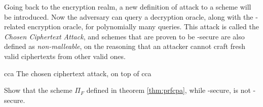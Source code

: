 Going back to the encryption realm, a new definition of attack to a \ske{} scheme will be introduced. Now the adversary can query a decryption oracle, along with the \cpa-related encryption oracle, for polynomially many queries. This attack is called the \emph{Chosen Ciphertext Attack}\footnotemark, and schemes that are proven to be \cca-secure are also defined as \emph{non-malleable}, on the reasoning that an attacker cannot craft fresh valid ciphertexts from other valid ones.



\begin{cryptogame}
    {cca}
    {The chosen ciphertext attack, on top of \cpa}
    {cca}


    \cseqbeginloop
    \cseqendloop

    \cseqdelay

    \cseqbeginloop
    \cseqendloop

    \cseqdelay


    \cseqdelay
    
    \cseqbeginloop
    \cseqendloop

    \cseqdelay

    \cseqbeginloop
    \cseqendloop

    \cseqdelay

\end{cryptogame}

\begin{exercise}
    Show that the scheme $\Pi_{F}$ defined in theorem \ref{thm:prfcpa}, while \cpa-secure, is not \cca-secure.
\end{exercise}

